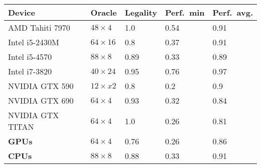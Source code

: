 \begin{tabular}{lllll}
\toprule
           Device &         Oracle & Legality & Perf.\ min & Perf.\ avg. \\
\midrule
  AMD Tahiti 7970 &   $48\times 4$ &      1.0 &       0.54 &        0.91 \\
   Intel i5-2430M &  $64\times 16$ &      0.8 &       0.37 &        0.91 \\
    Intel i5-4570 &   $88\times 8$ &     0.89 &       0.33 &        0.89 \\
    Intel i7-3820 &  $40\times 24$ &     0.95 &       0.76 &        0.97 \\
   NVIDIA GTX 590 &  $12\times x2$ &      0.8 &        0.2 &         0.9 \\
   NVIDIA GTX 690 &   $64\times 4$ &     0.93 &       0.32 &        0.84 \\
 NVIDIA GTX TITAN &   $64\times 4$ &      1.0 &       0.26 &        0.81 \\
    \textbf{GPUs} &   $64\times 4$ &     0.76 &       0.26 &        0.86 \\
    \textbf{CPUs} &   $88\times 8$ &     0.88 &       0.33 &        0.91 \\
\bottomrule
\end{tabular}

